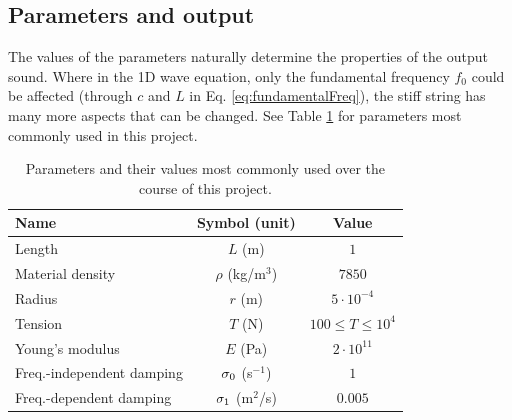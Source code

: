 \subsection{Parameters and output}\label{sec:paramsAndOutput}
The values of the parameters naturally determine the properties of the output sound. Where in the 1D wave equation, only the fundamental frequency $f_0$ could be affected (through $c$ and $L$ in Eq. \eqref{eq:fundamentalFreq}), the stiff string has many more aspects that can be changed. See Table \ref{tab:stiffStringParams} for parameters most commonly used in this project. 
\begin{table}[h]
    \begin{center}
    \begin{tabular}{|l|c|c|}
        \hline
        Name & Symbol (unit) & Value\\ \hline
        Length & $L$ (m) & $1$\\
        Material density & $\rho$ (kg/m$^3$) & $7850$\\
        Radius & $r$ (m) & $5\cdot10^{-4}$\\
        Tension & $T$ (N) &$100 \leq T \leq 10^4$\\
        Young's modulus & $E$ (Pa) & $2\cdot10^{11}$\\
        Freq.-independent damping & $\sigma_{0}$ (s$^{-1}$) & $1$\\
        Freq.-dependent damping & $\sigma_{1}$ (m$^2$/s) & $0.005$\\\hline
    \end{tabular}
    \caption{Parameters and their values most commonly used over the course of this project.\label{tab:stiffStringParams}}
    \end{center}
\end{table}
